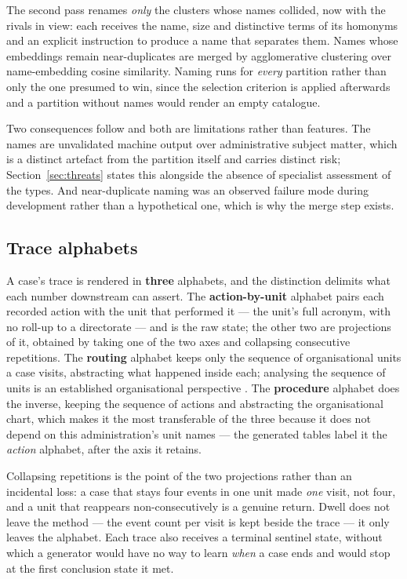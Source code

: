 The second pass renames \emph{only} the clusters whose names collided, now with the rivals in
view: each receives the name, size and distinctive terms of its homonyms and an explicit
instruction to produce a name that separates them. Names whose embeddings remain near-duplicates
are merged by agglomerative clustering over name-embedding cosine similarity. Naming runs for
\emph{every} partition rather than only the one presumed to win, since the selection criterion is
applied afterwards and a partition without names would render an empty catalogue.

Two consequences follow and both are limitations rather than features. The names are unvalidated
machine output over administrative subject matter, which is a distinct artefact from the
partition itself and carries distinct risk; Section~\ref{sec:threats} states this alongside the
absence of specialist assessment of the types. And near-duplicate naming was an observed failure
mode during development rather than a hypothetical one, which is why the merge step exists.

\subsection{Trace alphabets}\label{sec:alphabets}

A case's trace is rendered in \textbf{three} alphabets, and the distinction delimits what each
number downstream can assert. The \textbf{action-by-unit} alphabet pairs each recorded action
with the unit that performed it --- the unit's full acronym, with no roll-up to a directorate ---
and is the raw state; the other two are projections of it, obtained by taking one of the two axes
and collapsing consecutive repetitions. The \textbf{routing} alphabet keeps only the sequence of
organisational units a case visits, abstracting what happened inside each; analysing the sequence
of units is an established organisational perspective \citep{song2008organizational}. The
\textbf{procedure} alphabet does the inverse, keeping the sequence of actions and abstracting the
organisational chart, which makes it the most transferable of the three because it does not
depend on this administration's unit names --- the generated tables label it the \emph{action}
alphabet, after the axis it retains.

Collapsing repetitions is the point of the two projections rather than an incidental loss: a case
that stays four events in one unit made \emph{one} visit, not four, and a unit that reappears
non-consecutively is a genuine return. Dwell does not leave the method --- the event count per
visit is kept beside the trace --- it only leaves the alphabet. Each trace also receives a
terminal sentinel state, without which a generator would have no way to learn \emph{when} a case
ends and would stop at the first conclusion state it met.

